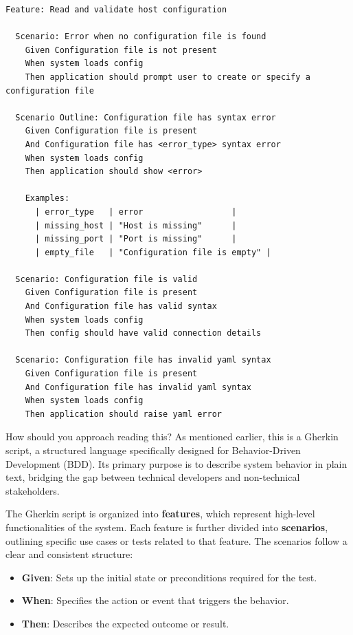 \documentclass[10pt , a4paper]{report}
\begin{document}
\begin{listing}[htbp]
  \begin{verbatim}
Feature: Read and validate host configuration

  Scenario: Error when no configuration file is found
    Given Configuration file is not present
    When system loads config  
    Then application should prompt user to create or specify a configuration file
  
  Scenario Outline: Configuration file has syntax error
    Given Configuration file is present
    And Configuration file has <error_type> syntax error
    When system loads config
    Then application should show <error>

    Examples:
      | error_type   | error                  |
      | missing_host | "Host is missing"      |
      | missing_port | "Port is missing"      |
      | empty_file   | "Configuration file is empty" |

  Scenario: Configuration file is valid
    Given Configuration file is present
    And Configuration file has valid syntax
    When system loads config
    Then config should have valid connection details

  Scenario: Configuration file has invalid yaml syntax
    Given Configuration file is present
    And Configuration file has invalid yaml syntax
    When system loads config
    Then application should raise yaml error
  \end{verbatim}
\end{listing}

How should you approach reading this? As mentioned earlier, this is a Gherkin script, a structured language specifically designed for Behavior-Driven Development (BDD). Its primary purpose is to describe system behavior in plain text, bridging the gap between technical developers and non-technical stakeholders.

\newpage
The Gherkin script is organized into \textbf{features}, which represent high-level functionalities of the system. Each feature is further divided into \textbf{scenarios}, outlining specific use cases or tests related to that feature. The scenarios follow a clear and consistent structure:

\begin{itemize}
  \item \textbf{Given}: Sets up the initial state or preconditions required for the test.
  \item \textbf{When}: Specifies the action or event that triggers the behavior.
  \item \textbf{Then}: Describes the expected outcome or result.
\end{itemize}
\end{document}
